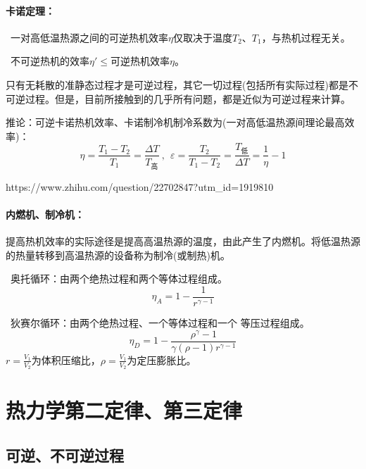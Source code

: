 \documentclass[zihao=-4,UTF8]{report}
\begin{document}
\subsubsection{卡诺定理：}
\ 一对高低温热源之间的可逆热机效率$\eta$仅取决于温度$T_2$、$T_1$，与热机过程无关。\par
{}\ 不可逆热机的效率$\eta' \le $可逆热机效率$\eta$。
{\par\color{gray}\small 只有无耗散的准静态过程才是可逆过程，其它一切过程(包括所有实际过程)都是不可逆过程。但是，目前所接触到的几乎所有问题，都是近似为可逆过程来计算。}\par
推论：可逆卡诺热机效率、卡诺制冷机制冷系数为(一对高低温热源间理论最高效率)：
\begin{equation}
    \eta = \frac{T_1 - T_2}{T_1} = \frac{\Delta T}{T_{\text{高}}}\ ,\ \ \varepsilon = \frac{T_2}{T_1 - T_2} =\frac{T_{\text{低}}}{\Delta T} = \frac{1}{\eta} -1
\end{equation}

https://www.zhihu.com/question/22702847?utm\_id=1919810 \par


\subsubsection{内燃机、制冷机：}
提高热机效率的实际途径是提高高温热源的温度，由此产生了内燃机。将低温热源的热量转移到高温热源的设备称为制冷(或制热)机。\par
{}\ 奥托循环：由两个绝热过程和两个等体过程组成。
\begin{equation}
    \eta_A = 1 - \frac{1}{r^{\gamma -1}}
\end{equation}

\par
{}\ 狄赛尔循环：由两个绝热过程、一个等体过程和一个 等压过程组成。
\begin{equation}
    \eta_D =1- \frac{\rho^{\gamma} -1}{\gamma(\rho -1) r^{\gamma -1}}
\end{equation}
{\color{gray}\small $r = \frac{V_1}{V_2}$为体积压缩比，$\rho = \frac{V_1}{V_2}$为定压膨胀比。}
\chapter{热力学第二定律、第三定律}
\section{可逆、不可逆过程}
\end{document}

